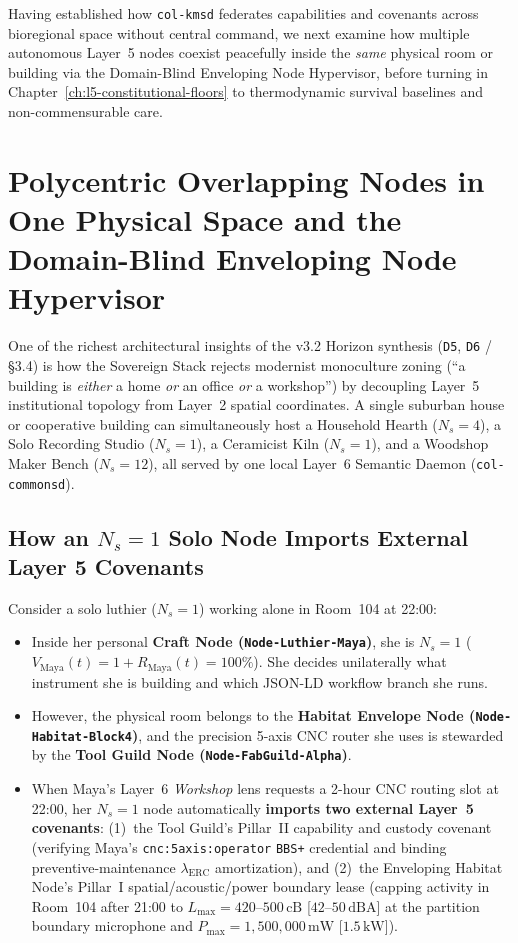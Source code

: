 Having established how \texttt{col-kmsd} federates capabilities and covenants across bioregional
space without central command, we next examine how multiple autonomous Layer~5 nodes coexist
peacefully inside the \textit{same} physical room or building via the Domain-Blind Enveloping Node
Hypervisor, before turning in Chapter~\ref{ch:l5-constitutional-floors} to thermodynamic survival
baselines and non-commensurable care.

\section{Polycentric Overlapping Nodes in One Physical Space and the Domain-Blind Enveloping Node Hypervisor}
\label{sec:ch5-enveloping-hypervisor}

One of the richest architectural insights of the v3.2 Horizon synthesis (\texttt{D5}, \texttt{D6}
/ \S3.4) is how the Sovereign Stack rejects modernist monoculture zoning (``a building is
\textit{either} a home \textit{or} an office \textit{or} a workshop'') by decoupling Layer~5
institutional topology from Layer~2 spatial coordinates. A single suburban house or cooperative
building can simultaneously host a Household Hearth ($N_s = 4$), a Solo Recording Studio
($N_s = 1$), a Ceramicist Kiln ($N_s = 1$), and a Woodshop Maker Bench ($N_s = 12$), all served by
one local Layer~6 Semantic Daemon (\texttt{col-commonsd}).

\subsection{How an $N_s = 1$ Solo Node Imports External Layer 5 Covenants}

Consider a solo luthier ($N_s = 1$) working alone in Room~104 at 22:00:
\begin{itemize}
\item Inside her personal \textbf{Craft Node (\texttt{Node-Luthier-Maya})}, she is $N_s = 1$
        ($V_{\mathrm{Maya}}(t) = 1 + R_{\mathrm{Maya}}(t) = 100\%$). She decides unilaterally what
        instrument she is building and which JSON-LD workflow branch she runs.
\item However, the physical room belongs to the \textbf{Habitat Envelope Node
        (\texttt{Node-Habitat-Block4})}, and the precision 5-axis CNC router she uses is stewarded
        by the \textbf{Tool Guild Node (\texttt{Node-FabGuild-Alpha})}.
\item When Maya's Layer~6 \textit{Workshop} lens requests a 2-hour CNC routing slot at 22:00, her
        $N_s = 1$ node automatically \textbf{imports two external Layer~5 covenants}: (1)~the Tool
        Guild's Pillar~II capability and custody covenant (verifying Maya's \texttt{cnc:5axis:operator}
        \texttt{BBS+} credential and binding preventive-maintenance $\lambda_{\mathrm{ERC}}$
        amortization), and (2)~the Enveloping Habitat Node's Pillar~I spatial/acoustic/power
        boundary lease (capping activity in Room~104 after 21:00 to $L_{\max} = 420\text{--}500\,\mathrm{cB}$
        [$42\text{--}50\,\mathrm{dBA}$] at the partition boundary microphone and
        $P_{\max} = 1{,}500{,}000\,\mathrm{mW}$ [$1.5\,\mathrm{kW}$]).
\end{itemize}

